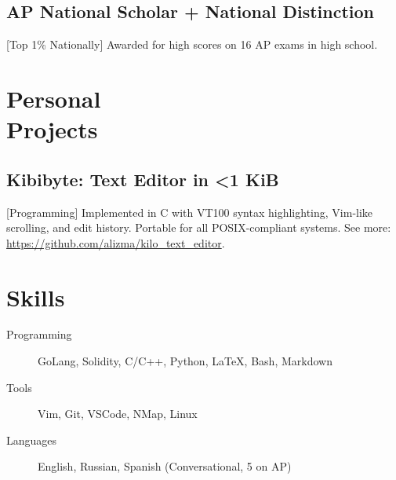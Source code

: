 \documentclass{mycv}
\begin{document}
\subsection{AP National Scholar + National Distinction}[Top 1\% Nationally]
Awarded for high scores on 16 AP exams in high school.

\section{Personal \\ Projects} 

\subsection{Kibibyte: Text Editor in <1 KiB}[Programming]
Implemented in C with VT100 syntax highlighting, Vim-like scrolling, and edit history. Portable for all POSIX-compliant systems. See more: \url{https://github.com/alizma/kilo_text_editor}.

\section{Skills}

\begin{description}
  \item[Programming] GoLang, Solidity, C/C++, Python, \LaTeX, Bash, Markdown
  \item[Tools] Vim, Git, VSCode, NMap, Linux
  \item[Languages] English, Russian, Spanish (Conversational, 5 on AP)
\end{description}
\end{document}
